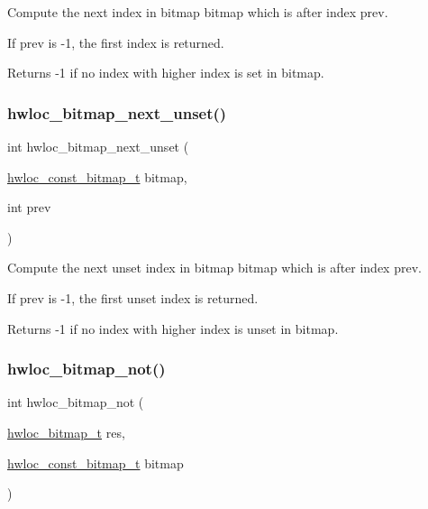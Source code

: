 Compute the next index in bitmap {\ttfamily bitmap} which is after index {\ttfamily prev}. 

If {\ttfamily prev} is -\/1, the first index is returned.

\begin{DoxyReturn}{Returns}
-\/1 if no index with higher index is set in {\ttfamily bitmap}. 
\end{DoxyReturn}
\mbox{\label{a00205_ga9653af34d1460ef106b7df25af4cdca8}} 
\subsubsection{\texorpdfstring{hwloc\+\_\+bitmap\+\_\+next\+\_\+unset()}{hwloc\_bitmap\_next\_unset()}}
{\footnotesize\ttfamily int hwloc\+\_\+bitmap\+\_\+next\+\_\+unset (\begin{DoxyParamCaption}\item[{\hyperlink{a00205_gae991a108af01d408be2776c5b2c467b2}{hwloc\+\_\+const\+\_\+bitmap\+\_\+t}}]{bitmap,  }\item[{int}]{prev }\end{DoxyParamCaption})}



Compute the next unset index in bitmap {\ttfamily bitmap} which is after index {\ttfamily prev}. 

If {\ttfamily prev} is -\/1, the first unset index is returned.

\begin{DoxyReturn}{Returns}
-\/1 if no index with higher index is unset in {\ttfamily bitmap}. 
\end{DoxyReturn}
\mbox{\label{a00205_ga84cfdb4f8ab8c1f7e097728e613a2a3f}} 
\subsubsection{\texorpdfstring{hwloc\+\_\+bitmap\+\_\+not()}{hwloc\_bitmap\_not()}}
{\footnotesize\ttfamily int hwloc\+\_\+bitmap\+\_\+not (\begin{DoxyParamCaption}\item[{\hyperlink{a00205_gaa3c2bf4c776d603dcebbb61b0c923d84}{hwloc\+\_\+bitmap\+\_\+t}}]{res,  }\item[{\hyperlink{a00205_gae991a108af01d408be2776c5b2c467b2}{hwloc\+\_\+const\+\_\+bitmap\+\_\+t}}]{bitmap }\end{DoxyParamCaption})}



